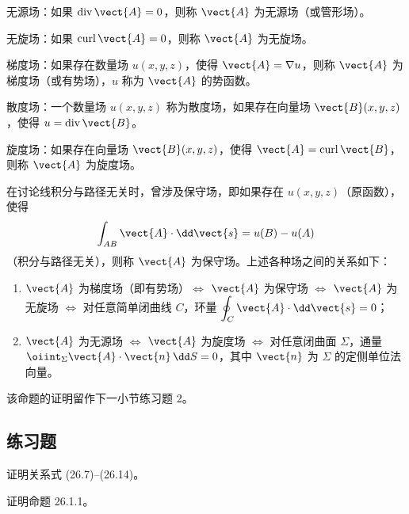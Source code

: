 无源场：如果 $\operatorname{div}\vect{A}=0$，则称 $\vect{A}$ 为无源场（或管形场）。

无旋场：如果 $\operatorname{curl}\vect{A}=0$，则称 $\vect{A}$ 为无旋场。

梯度场：如果存在数量场 $u(x,y,z)$，使得 $\vect{A}=\nabla u$，则称 $\vect{A}$ 为梯度场（或有势场），$u$ 称为 $\vect{A}$ 的势函数。

散度场：一个数量场 $u(x,y,z)$ 称为散度场，如果存在向量场 $\vect{B}(x,y,z)$，使得 $u=\operatorname{div}\vect{B}$。

旋度场：如果存在向量场 $\vect{B}(x,y,z)$，使得 $\vect{A}=\operatorname{curl}\vect{B}$，则称 $\vect{A}$ 为旋度场。

在讨论线积分与路径无关时，曾涉及保守场，即如果存在 $u(x,y,z)$（原函数），使得
\[
  \int_{AB}\vect{A}\cdot\dd\vect{s}=u(B)-u(A)
\]
（积分与路径无关），则称 $\vect{A}$ 为保守场。上述各种场之间的关系如下：

\begin{xproposition}[26.1.1]
\begin{enumerate}[label=(\arabic*)]
  \item $\vect{A}$ 为梯度场（即有势场）$\Longleftrightarrow$ $\vect{A}$ 为保守场 $\Longleftrightarrow$ $\vect{A}$ 为无旋场 $\Longleftrightarrow$ 对任意简单闭曲线 $C$，环量 $\displaystyle\oint_C\vect{A}\cdot\dd\vect{s}=0$；
  \item $\vect{A}$ 为无源场 $\Longleftrightarrow$ $\vect{A}$ 为旋度场 $\Longleftrightarrow$ 对任意闭曲面 $\Sigma$，通量 $\displaystyle\oiint_\Sigma\vect{A}\cdot\vect{n}\,\dd S=0$，其中 $\vect{n}$ 为 $\Sigma$ 的定侧单位法向量。
\end{enumerate}
\end{xproposition}

该命题的证明留作下一小节练习题 2。

\subsection{练习题}

\begin{xexercise}[1]
证明关系式 (26.7)--(26.14)。
\end{xexercise}

\begin{xexercise}[2]
证明命题 26.1.1。
\end{xexercise}

